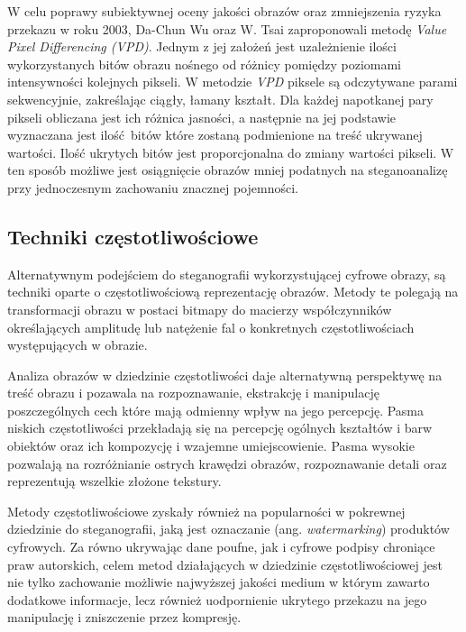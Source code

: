 {{{            %
            W celu poprawy subiektywnej oceny jakości obrazów oraz zmniejszenia ryzyka przekazu w roku 2003, Da-Chun Wu
            oraz  W. Tsai zaproponowali metodę \textit{Value Pixel Differencing (VPD)}. Jednym z jej założeń jest
            uzależnienie  ilości wykorzystanych bitów obrazu nośnego od różnicy pomiędzy poziomami intensywności
            kolejnych  pikseli\cite{Wu2003ASM}. W metodzie \textit{VPD} piksele są odczytywane parami sekwencyjnie,
            zakreślając ciągły,  łamany kształt. Dla każdej napotkanej pary pikseli obliczana jest ich różnica jasności,
            a następnie na jej  podstawie wyznaczana jest ilość bitów które zostaną podmienione na treść ukrywanej
            wartości. Ilość ukrytych  bitów jest proporcjonalna do zmiany wartości pikseli. W ten sposób możliwe jest
            osiągnięcie obrazów mniej  podatnych na steganoanalizę przy jednoczesnym zachowaniu znacznej
            pojemności\cite{Wu2003ASM}.
            
        }

        \subsection{Techniki częstotliwościowe}
        {
            Alternatywnym podejściem do steganografii wykorzystującej cyfrowe obrazy, są techniki oparte o
            częstotliwościową reprezentację obrazów. Metody te polegają na transformacji obrazu w postaci bitmapy do
            macierzy współczynników określających amplitudę lub natężenie fal o konkretnych częstotliwościach
            występujących w obrazie\cite{ImageCompressionDCT, Reichel2001IntegerWT}.

            Analiza obrazów w dziedzinie częstotliwości daje alternatywną perspektywę na treść obrazu i pozawala na
            rozpoznawanie, ekstrakcję i manipulację poszczególnych cech które mają odmienny wpływ na jego percepcję.
            Pasma niskich częstotliwości przekładają się na percepcję ogólnych kształtów i barw obiektów oraz ich
            kompozycję i wzajemne umiejscowienie. Pasma wysokie pozwalają na rozróżnianie ostrych krawędzi obrazów,
            rozpoznawanie detali oraz reprezentują wszelkie złożone tekstury\cite{ImageSpatialFreq}.

            Metody częstotliwościowe zyskały również na popularności w pokrewnej dziedzinie do steganografii, jaką jest
            oznaczanie (ang. \textit{watermarking}) produktów cyfrowych. Za równo ukrywając dane poufne, jak i cyfrowe
            podpisy chroniące praw autorskich, celem metod działających w dziedzinie częstotliwościowej jest nie tylko
            zachowanie możliwie najwyższej jakości medium w którym zawarto dodatkowe informacje, lecz również
            uodpornienie ukrytego przekazu na jego manipulację i zniszczenie przez kompresję\cite{Tao2014RobustIW}.

}}}
